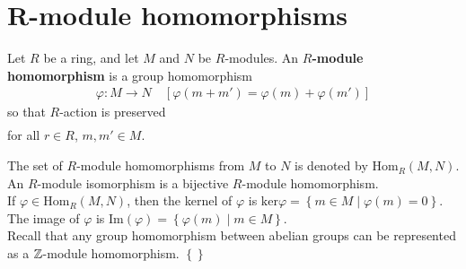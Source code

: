 \documentclass{memoir}
\begin{document}
\section{R-module homomorphisms}
\label{sec:r_module_homomorphisms}

\begin{defn}
	Let \(R\) be a ring, and let \(M\) and \(N\) be \(R\)-modules. An \textbf{\(R\)-module homomorphism} is a group homomorphism
	\begin{align*}
		\varphi:M\to N \quad [\varphi(m+m') = \varphi(m) + \varphi(m')]
	\end{align*}
	so that \(R\)-action is preserved
	\begin{align*}
		[\varphi(rm) = r\varphi(m)]
	\end{align*}
	for all \(r \in R\), \(m,m' \in M\).
\end{defn}
The set of \(R\)-module homomorphisms from \(M\) to \(N\) is denoted by \( \textrm{Hom}_R(M,N)\).\\

An \(R\)-module isomorphism is a bijective \(R\)-module homomorphism.\\

If \(\varphi \in \textrm{Hom}_R(M,N)\), then the kernel of \(\varphi\) is \( \textrm{ker}\varphi = \left\{m \in M \mid \varphi(m) = 0 \right\} \). The image of \(\varphi\) is \( \textrm{Im}(\varphi) = \left\{\varphi(m) \mid m \in M \right\} \).\\

Recall that any group homomorphism between abelian groups can be represented as a \(\mathbb{Z}\)-module homomorphism. \(\left\{  \right\} \)
\end{document}

